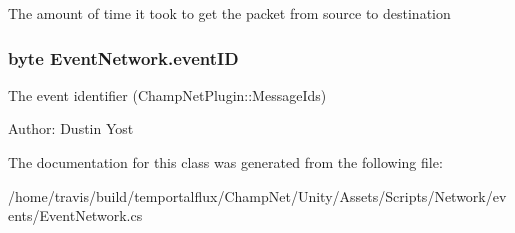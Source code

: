 The amount of time it took to get the packet from source to destination 

\hypertarget{class_event_network_adff900346978771c10eddbe469755039}{
\subsubsection[{event\-I\-D}]{\setlength{\rightskip}{0pt plus 5cm}byte Event\-Network.\-event\-I\-D}}\label{class_event_network_adff900346978771c10eddbe469755039}


The event identifier (Champ\-Net\-Plugin\-::\-Message\-Ids) 

Author\-: Dustin Yost 

The documentation for this class was generated from the following file\-:\begin{DoxyCompactItemize}
\item 
/home/travis/build/temportalflux/\-Champ\-Net/\-Unity/\-Assets/\-Scripts/\-Network/events/Event\-Network.\-cs\end{DoxyCompactItemize}
